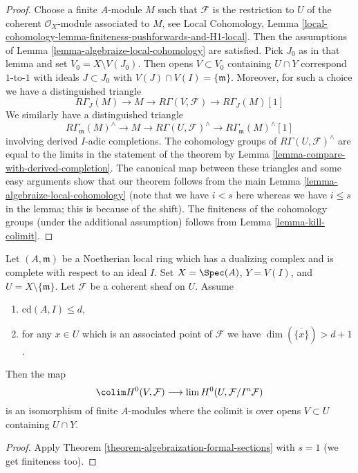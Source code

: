 \begin{proof}
Choose a finite $A$-module $M$ such that $\mathcal{F}$ is the
restriction to $U$ of the
coherent $\mathcal{O}_X$-module associated to $M$, see Local Cohomology,
Lemma \ref{local-cohomology-lemma-finiteness-pushforwards-and-H1-local}.
Then the assumptions of
Lemma \ref{lemma-algebraize-local-cohomology}
are satisfied.
Pick $J_0$ as in that lemma and set $V_0 = X \setminus V(J_0)$.
Then opens $V \subset V_0$ containing $U \cap Y$
correspond $1$-to-$1$ with ideals $J \subset J_0$ with
$V(J) \cap V(I) = \{\mathfrak m\}$.
Moreover, for such a choice we have a distinguished triangle
$$
R\Gamma_J(M) \to M \to R\Gamma(V, \mathcal{F}) \to
R\Gamma_J(M)[1]
$$
We similarly have a distinguished triangle
$$
R\Gamma_\mathfrak m(M)^\wedge \to
M \to
R\Gamma(U, \mathcal{F})^\wedge \to
R\Gamma_\mathfrak m(M)^\wedge[1]
$$
involving derived $I$-adic completions.
The cohomology groups of $R\Gamma(U, \mathcal{F})^\wedge$ are
equal to the limits in the statement of the theorem by
Lemma \ref{lemma-compare-with-derived-completion}.
The canonical map between these triangles
and some easy arguments show that our
theorem follows from the main Lemma \ref{lemma-algebraize-local-cohomology}
(note that we have $i < s$ here whereas we have
$i \leq s$ in the lemma; this is because of the shift).
The finiteness of the cohomology groups
(under the additional assumption) follows from
Lemma \ref{lemma-kill-colimit}.
\end{proof}

\begin{lemma}
\label{lemma-application-theorem}
Let $(A, \mathfrak m)$ be a Noetherian local ring which has a
dualizing complex and is complete with respect to an ideal $I$.
Set $X = \Spec(A)$, $Y = V(I)$, and $U = X \setminus \{\mathfrak m\}$.
Let $\mathcal{F}$ be a coherent sheaf on $U$.
Assume
\begin{enumerate}
\item $\text{cd}(A, I) \leq d$,
\item for any $x \in U$ which is an associated point of $\mathcal{F}$
we have $\dim(\overline{\{x\}}) > d + 1$.
\end{enumerate}
Then the map
$$
\colim H^0(V, \mathcal{F})
\longrightarrow
\lim H^0(U, \mathcal{F}/I^n\mathcal{F})
$$
is an isomorphism of finite $A$-modules
where the colimit is over opens $V \subset U$
containing $U \cap Y$.
\end{lemma}

\begin{proof}
Apply Theorem \ref{theorem-algebraization-formal-sections} with $s = 1$
(we get finiteness too).
\end{proof}




